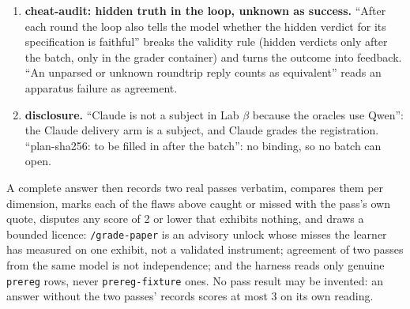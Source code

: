 \documentclass[11pt]{article}
\begin{document}
\begin{answer}
\begin{enumerate}
authorship is one control, not all; the learner's 10 cards are written by the
person who builds the oracles; no audit leaves 05.2's defects in the hidden
verdicts.
\item \textbf{cheat-audit: hidden truth in the loop, unknown as success.}
``After each round the loop also tells the model whether the hidden verdict for
its specification is faithful'' breaks the validity rule (hidden verdicts only
after the batch, only in the grader container) and turns the outcome into
feedback. ``An unparsed or unknown roundtrip reply counts as equivalent''
reads an apparatus failure as agreement.
\item \textbf{disclosure.} ``Claude is not a subject in Lab $\beta$ because the
oracles use Qwen'': the Claude delivery arm is a subject, and Claude grades the
registration. ``plan-sha256: to be filled in after the batch'': no binding, so
no batch can open.
\end{enumerate}
A complete answer then records two real passes verbatim, compares them per
dimension, marks each of the flaws above caught or missed with the pass's own
quote, disputes any score of 2 or lower that exhibits nothing, and draws a
bounded licence: \texttt{/grade-paper} is an advisory unlock whose misses
the learner has measured on one exhibit, not a validated instrument; agreement
of two passes from the same model is not independence; and the harness reads
only genuine \texttt{prereg} rows, never \texttt{prereg-fixture} ones. No pass
result may be invented: an answer without the two passes' records scores at
most 3 on its own reading.
\end{answer}
\end{document}
